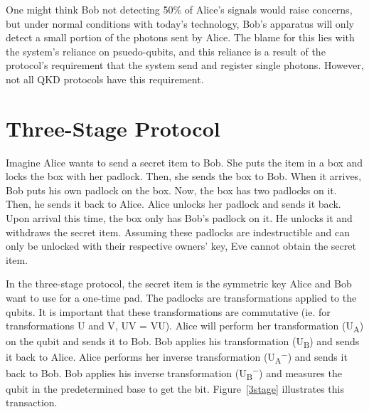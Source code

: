 \documentclass[12pt,twocolumn]{article}
\begin{document}
One might think Bob not detecting 50\% of Alice's signals would raise concerns, but under normal conditions with today's technology, Bob's apparatus will only detect a small portion of the photons sent by Alice. The blame for this lies with the system's reliance on psuedo-qubits, and this reliance is a result of the protocol's requirement that the system send and register single photons. However, not all QKD protocols have this requirement.

\section{Three-Stage Protocol}
Imagine Alice wants to send a secret item to Bob. She puts the item in a box and locks the box with her padlock. Then, she sends the box to Bob. When it arrives, Bob puts his own padlock on the box. Now, the box has two padlocks on it. Then, he sends it back to Alice. Alice unlocks her padlock and sends it back. Upon arrival this time, the box only has Bob's padlock on it. He unlocks it and withdraws the secret item. Assuming these padlocks are indestructible and can only be unlocked with their respective owners' key, Eve cannot obtain the secret item.

In the three-stage protocol\cite{kak:06}, the secret item is the symmetric key Alice and Bob want to use for a one-time pad.
The padlocks are transformations\cite{kak:00} applied to the qubits.
It is important that these transformations are commutative (ie. for transformations U and V, UV = VU).
Alice will perform her transformation (U\textsubscript{A}) on the qubit and sends it to Bob.
Bob applies his transformation (U\textsubscript{B}) and sends it back to Alice.
Alice performs her inverse transformation (U\textsubscript{A}\textsuperscript{$-$}) and sends it back to Bob.
Bob applies his inverse transformation (U\textsubscript{B}\textsuperscript{$-$}) and measures the qubit in the predetermined base to get the bit.
Figure~\ref{3stage} illustrates this transaction.

\end{document}
